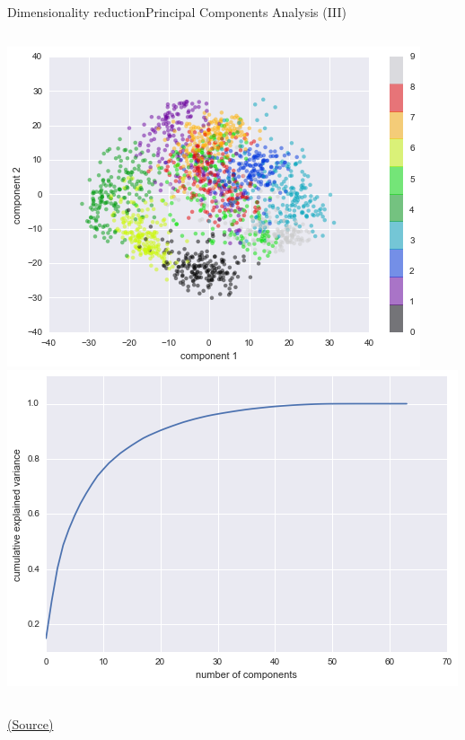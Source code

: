 \documentclass[10pt,compress]{beamer} %
\begin{document}
\begin{frame}{Dimensionality reduction}{Principal Components Analysis (III)}
    \begin{columns}
			\includegraphics[width=\linewidth]{figs/handdigitspca.png}
			\includegraphics[width=\linewidth]{figs/pcacomponents.png}
    \end{columns}

   	\centering \tiny{\href{https://github.com/amueller/introduction_to_ml_with_python/blob/master/03-unsupervised-learning.ipynb}{(Source)}}
\end{frame}
\end{document}
